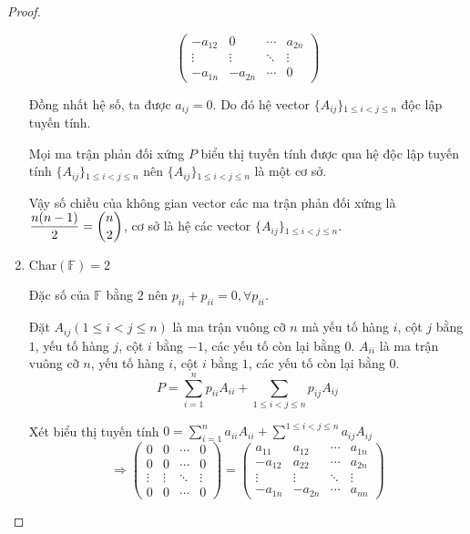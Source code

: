 \documentclass[class=linearalgebra,crop=false]{standalone}
\begin{document}
\begin{proof}
\begin{enumerate}
\[\begin{pmatrix}
                    -a_{12} & 0 & \cdots & a_{2n} \\
                    \vdots & \vdots & \ddots & \vdots \\
                    -a_{1n} & -a_{2n} & \cdots & 0
                \end{pmatrix}
            \]
            \par Đồng nhất hệ số, ta được $a_{ij} = 0$. Do đó hệ vector $\{ A_{ij} \}{}_{1\le i < j \le n}$ độc lập tuyến tính.
            \par Mọi ma trận phản đối xứng $P$ biểu thị tuyến tính được qua hệ độc lập tuyến tính $\{ A_{ij} \}{}_{1\le i < j \le n}$ nên $\{ A_{ij} \}{}_{1\le i < j \le n}$ là một cơ sở.
            \par Vậy số chiều của không gian vector các ma trận phản đối xứng là $\dfrac{n(n-1)}{2} = \dbinom{n}{2}$, cơ sở là hệ các vector $\{ A_{ij} \}{}_{1\le i < j \le n}$.
        \item $\text{Char}(\mathbb{F}) = 2$
            \par Đặc số của $\mathbb{F}$ bằng $2$ nên $p_{ii} + p_{ii} = 0, \forall p_{ii}$.
            \par Đặt $A_{ij} (1\le i < j\le n)$ là ma trận vuông cỡ $n$ mà yếu tố hàng $i$, cột $j$ bằng $1$, yếu tố hàng $j$, cột $i$ bằng $-1$, các yếu tố còn lại bằng $0$. $A_{ii}$ là ma trận vuông cỡ $n$, yếu tố hàng $i$, cột $i$ bằng $1$, các yếu tố còn lại bằng $0$.
                \[ P = \sum^{n}_{i=1}p_{ii}A_{ii} + \sum_{1\le i < j \le n}p_{ij}A_{ij} \]
            \par Xét biểu thị tuyến tính $0 = \sum^{n}_{i=1}a_{ii}A_{ii} + \sum^{1\le i < j \le n}a_{ij}A_{ij}$
            \[
                \Rightarrow
                \begin{pmatrix}
                    0 & 0 & \cdots & 0 \\
                    0 & 0 & \cdots & 0 \\
                    \vdots & \vdots & \ddots & \vdots \\
                    0 & 0 & \cdots & 0
                \end{pmatrix} =
                \begin{pmatrix}
                    a_{11} & a_{12} & \cdots & a_{1n} \\
                    -a_{12} & a_{22} & \cdots & a_{2n} \\
                    \vdots & \vdots & \ddots & \vdots \\
                    -a_{1n} & -a_{2n} & \cdots & a_{nn}

\end{pmatrix}\]
\end{enumerate}
\end{proof}
\end{document}
